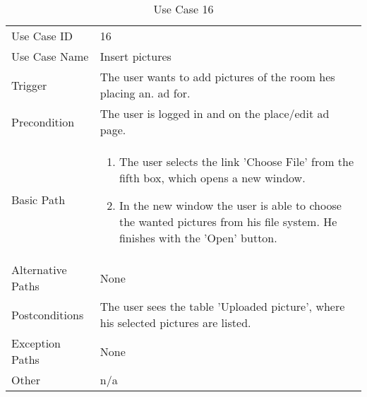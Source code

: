 \begin{table}[H]
\centering
\label{table-use-case-16}
\begin{tabular}{|p{3cm}|p{10cm}}
Use Case ID       & 16                                                      \\
Use Case Name     & Insert pictures                            \\
Trigger           & The user wants to add pictures of the room hes placing an.
ad for. \\ 
Precondition      & The user is logged in and on the place/edit ad page.            
\\
Basic Path        & \begin{enumerate}
\item		The user selects the link 'Choose File' from the fifth box, which opens a
new window.
\item       In the new window the user is able to choose the wanted pictures
			from his file system. He finishes with the 'Open' button.
\end{enumerate} 
     \\
Alternative Paths & None                          \\
Postconditions    & The user sees the table 'Uploaded picture', where his
selected pictures are listed.
\\
Exception Paths   & None			\\
Other             & n/a                                                                                                                                                                                                        
\end{tabular}
\caption{Use Case 16}
\end{table}

